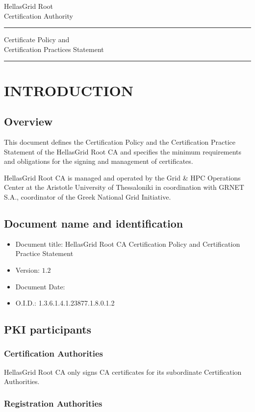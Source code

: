 \documentclass[11pt,a4paper,titlepage]{book}
\renewcommand{\maketitle}{\begin{titlepage}%
 \begin{flushright}
   {\Large
     HellasGrid Root\\
     Certification Authority\\
   }
 \end{flushright}
 \rule{\textwidth}{3pt}
 \begin{flushright}
   \textsf{\Huge Certificate Policy and\\ 
            Certification Practices Statement\\}
 \end{flushright}
 \rule{\textwidth}{3pt}
 \vspace{\fill}
 \end{titlepage}
}%
\begin{document}
\maketitle
\tableofcontents

\chapter{INTRODUCTION}
\section{Overview}


This document defines the Certification Policy and the Certification Practice Statement of the HellasGrid Root CA and specifies the minimum requirements and obligations for the signing and management of certificates.

HellasGrid Root CA is managed and operated by the Grid \& HPC Operations Center at the Aristotle University of Thessaloniki in coordination with GRNET S.A., coordinator of the Greek National Grid Initiative.

\section{Document name and identification}

\begin{itemize}
\item{Document title: HellasGrid Root CA Certification Policy and Certification Practice Statement}
\item{Version: $1.2$}
\item{Document Date: \date{20 Mar, 2010}}
\item{O.I.D.: 1.3.6.1.4.1.23877.1.8.0.1.2}
\end{itemize}

\section{PKI participants}

\subsection{Certification Authorities}

HellasGrid Root CA only signs CA certificates for its subordinate Certification Authorities. 

\subsection{Registration Authorities}
\end{document}
